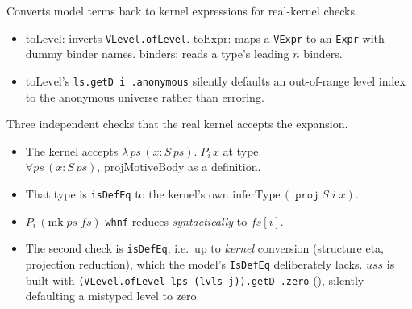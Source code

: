 \begin{example}
  \label{fam:projshape-back-translation}
  \leanok

   Converts model terms back to kernel expressions for real-kernel checks.
  \begin{itemize}
  \item $\mathrm{toLevel}$: inverts \texttt{VLevel.ofLevel}. $\mathrm{toExpr}$: maps a
        \texttt{VExpr} to an \texttt{Expr} with dummy binder names. $\mathrm{binders}$: reads a
        type's leading $n$ binders.
  \item {} $\mathrm{toLevel}$'s \texttt{ls.getD i .anonymous} silently defaults an
        out-of-range level index to the anonymous universe rather than erroring.
  \end{itemize}
\end{example}

\begin{example}
  \label{def:projshape-checkproj}
  \leanok

   Three independent checks that the real kernel accepts the expansion.
  \begin{itemize}
  \item The kernel accepts $\lambda\,ps\,(x{:}S\,ps).\;P_i\,x$ at type $\forall
        ps\,(x{:}S\,ps),\,\mathrm{projMotiveBody}$ as a definition.
  \item That type is \texttt{isDefEq} to the kernel's own $\mathrm{inferType}\,
        (\mathtt{.proj}\;S\;i\;x)$.
  \item $P_i\,(\mathrm{mk}\;ps\;fs)$ \texttt{whnf}-reduces \emph{syntactically} to $fs[i]$.
  \item {} The second check is \texttt{isDefEq}, i.e.\ up to \emph{kernel} conversion
        (structure eta, projection reduction), which the model's \texttt{IsDefEq} deliberately
        lacks. $uss$ is built with \texttt{(VLevel.ofLevel lps (lvls j)).getD .zero}
        (), silently defaulting a mistyped level to
        zero.
  \end{itemize}
\end{example}

